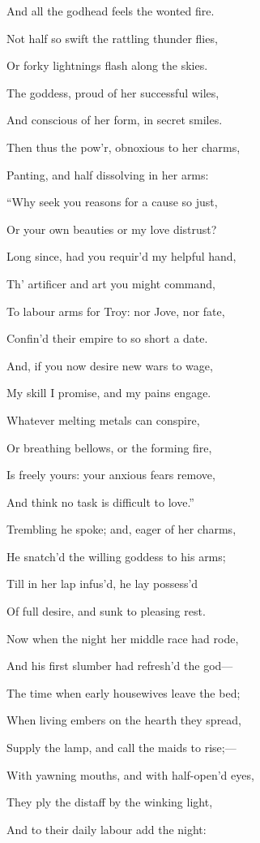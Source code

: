 And all the godhead feels the wonted fire.

Not half so swift the rattling thunder flies,

Or forky lightnings flash along the skies.

The goddess, proud of her successful wiles,

And conscious of her form, in secret smiles.

Then thus the pow’r, obnoxious to her charms,

Panting, and half dissolving in her arms:

“Why seek you reasons for a cause so just,

Or your own beauties or my love distrust?

Long since, had you requir’d my helpful hand,

Th’ artificer and art you might command,

To labour arms for Troy: nor Jove, nor fate,

Confin’d their empire to so short a date.

And, if you now desire new wars to wage,

My skill I promise, and my pains engage.

Whatever melting metals can conspire,

Or breathing bellows, or the forming fire,

Is freely yours: your anxious fears remove,

And think no task is difficult to love.”

Trembling he spoke; and, eager of her charms,

He snatch’d the willing goddess to his arms;

Till in her lap infus’d, he lay possess’d

Of full desire, and sunk to pleasing rest.

Now when the night her middle race had rode,

And his first slumber had refresh’d the god—

The time when early housewives leave the bed;

When living embers on the hearth they spread,

Supply the lamp, and call the maids to rise;—

With yawning mouths, and with half-open’d eyes,

They ply the distaff by the winking light,

And to their daily labour add the night:

